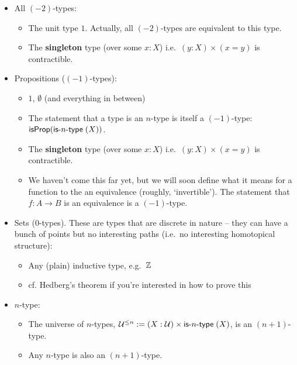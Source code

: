 \documentclass[10pt,oneside,leqno,openright]{memoir}
\begin{document}
\begin{example}\phantom{.}
  \begin{itemize}
  \item All $(-2)$-types:
    \begin{itemize}
      \item The unit type $1$. Actually, all $(-2)$-types are equivalent to this type.
      \item The \textbf{singleton} type (over some $x:X$) i.e.\ $(y : X) \times (x = y)$ is contractible.
    \end{itemize}
  \item Propositions ($(-1)$-types):
    \begin{itemize}
    \item $1$, $\emptyset$ (and everything in between)
    \item The statement that a type is an $n$-type is itself a $(-1)$-type: $\mathsf{isProp}(\textsf{is-{$n$}-type}\;(X))$.
    \item The \textbf{singleton} type (over some $x:X$) i.e.\ $(y : X) \times (x = y)$ is contractible.
    \item We haven't come this far yet, but we will soon define what it means for a function to the an equivalence (roughly, `invertible'). The statement that $f: A \to B$ is an equivalence is a $(-1)$-type.
    \end{itemize}
  \item Sets ($0$-types). These are types that are discrete in nature -- they can have a bunch of points but no interesting paths (i.e.\ no interesting homotopical structure):
    \begin{itemize}
    \item Any (plain) inductive type, e.g.\ $\mathbb{Z}$
    \item cf. Hedberg's theorem if you're interested in how to prove this
    \end{itemize}
  \item $n$-type:
    \begin{itemize}
    \item The universe of $n$-types, $\mathcal{U}^{\le n} := (X : \mathcal{U}) \times \textsf{is-{$n$}-type}\;(X)$, is an $(n+1)$-type.
    \item Any $n$-type is also an $(n+1)$-type.
    \end{itemize}
  \end{itemize}
\end{example}

\end{document}
